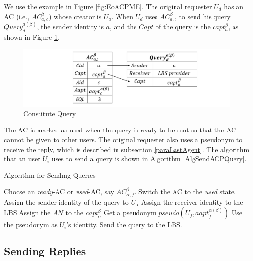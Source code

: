 We use the example in Figure \ref{fig:EoACPME}. The original requester $U_d$ has an AC (i.e., ${AC}^{\beta }_{a,c}$) whose creator is $U_a$. When $U_d$ uses ${AC}^{\beta }_{a,c}$ to send his query ${Query}^{a\left(\beta\right)}_d$, the sender identity is $a$, and the $Capt$ of the query is the $capt_a^\beta$, as shown in Figure \ref{fig:ConstituteQuery}.

\begin{figure} [H]
\centering 
\includegraphics[width=6.0in]{figures/FIG_4_5_Constitute_Query.png}
\caption{Constitute Query} 
\label{fig:ConstituteQuery} %
\end{figure}

The AC is marked as used when the query is ready to be sent so that the AC cannot be given to other users. The original requester also uses a pseudonym to receive the reply, which is described in subsection \ref{paraLastAgent}. The algorithm that an user $U_i$ uses to send a query is shown in Algorithm \ref{AlgSendACPQuery}.


\begin{algorithm} [hbtp]
\caption{Algorithm for Sending Queries}\label{AlgSendACPQuery}
\begin{algorithmic}[1]
 {}
\State Choose an \textit{ready}-AC or \textit{used}-AC, say ${AC}_{\alpha,f}^{\beta}$.
\State Switch the AC to the \textit{used} state.
\EndIf
\State Assign the sender identity of the query to $U_{\alpha}$
\State Assign the receiver identity to the LBS
\State Assign the $AN$ to the ${capt}_{\alpha}^{\beta}$
\State Get a pseudonym $pseudo\left(U_f,{aapt}_f^{\alpha \left(\beta \right)}\right)$
\State Use the pseudonym as $U_i$’s identity.
\State Send the query to the LBS.
\EndProcedure
\end{algorithmic}
\end{algorithm}

\subsection{Sending Replies}



